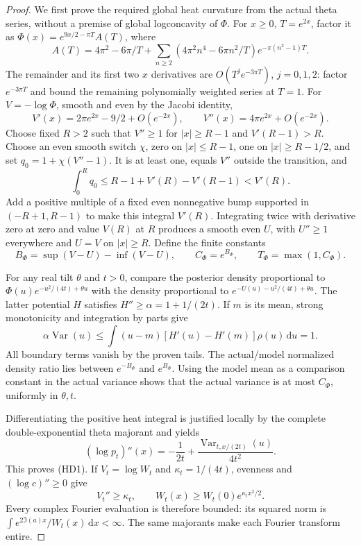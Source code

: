 \documentclass[11pt]{article}
\theoremstyle{remark}\newtheorem{remark}[theorem]{Remark}
\newcommand{\dd}{\,\mathrm d}
\begin{document}
\begin{proof}
We first prove the required global heat curvature from the actual
theta series, without a premise of global logconcavity of \(\Phi\).
For \(x\ge0\), \(T=e^{2x}\), factor it as
\(\Phi(x)=e^{9x/2-\pi T}A(T)\), where
\[
 A(T)=4\pi^2-6\pi/T+
 \sum_{n\ge2}(4\pi^2n^4-6\pi n^2/T)e^{-\pi(n^2-1)T}.
\]
The remainder and its first two \(x\) derivatives are
\(O(T^je^{-3\pi T})\), \(j=0,1,2\): factor \(e^{-3\pi T}\)
and bound the remaining polynomially weighted series at \(T=1\).
For \(V=-\log\Phi\), smooth and even by the Jacobi identity,
\[
 V'(x)=2\pi e^{2x}-9/2+O(e^{-2x}),\qquad
 V''(x)=4\pi e^{2x}+O(e^{-2x}) .
                                                               \tag{HD6}
\]
Choose fixed \(R>2\) such that \(V''\ge1\) for \(|x|\ge R-1\)
and \(V'(R-1)>R\). Choose an even smooth switch \(\chi\),
zero on \(|x|\le R-1\), one on \(|x|\ge R-1/2\), and set
\(q_0=1+\chi(V''-1)\). It is at least one, equals \(V''\)
outside the transition, and
\[
 \int_0^Rq_0\le R-1+V'(R)-V'(R-1)<V'(R).
\]
Add a positive multiple of a fixed even nonnegative bump supported
in \((-R+1,R-1)\) to make this integral \(V'(R)\).
Integrating twice with derivative zero at zero and value \(V(R)\)
at \(R\) produces a smooth even \(U\), with \(U''\ge1\)
everywhere and \(U=V\) on \(|x|\ge R\).
Define the finite constants
\[
 B_\Phi=\sup(V-U)-\inf(V-U),\qquad C_\Phi=e^{B_\Phi},\qquad
                         T_\Phi=\max(1,C_\Phi).
\]

For any real tilt \(\theta\) and \(t>0\), compare the posterior
density proportional to
\(\Phi(u)e^{-u^2/(4t)+\theta u}\) with the density proportional
to \(e^{-U(u)-u^2/(4t)+\theta u}\).
The latter potential \(H\) satisfies \(H''\ge\alpha=1+1/(2t)\).
If \(m\) is its mean, strong monotonicity and integration by parts give
\[
 \alpha\operatorname{Var}(u)
 \le\int(u-m)[H'(u)-H'(m)]\rho(u)\dd u=1 .
\]
All boundary terms vanish by the proven tails.
The actual/model normalized density ratio lies between
\(e^{-B_\Phi}\) and \(e^{B_\Phi}\).
Using the model mean as a comparison constant in the actual
variance shows that the actual variance is at most \(C_\Phi\),
uniformly in \(\theta,t\).

Differentiating the positive heat integral is justified locally
by the complete double-exponential theta majorant and yields
\[
 (\log p_t)''(x)=-\frac1{2t}
    +\frac{\operatorname{Var}_{t,x/(2t)}(u)}{4t^2}.
\]
This proves (HD1). If \(V_t=\log W_t\) and \(\kappa_t=1/(4t)\),
evenness and \((\log c)''\ge0\) give
\[
 V_t''\ge\kappa_t,\qquad
               W_t(x)\ge W_t(0)e^{\kappa_t x^2/2}.              \tag{HD7}
\]
Every complex Fourier evaluation is therefore bounded:
its squared norm is \(\int e^{2\Im(a)x}/W_t(x)\dd x<\infty\).
The same majorants make each Fourier transform entire.


\end{proof}
\end{document}
